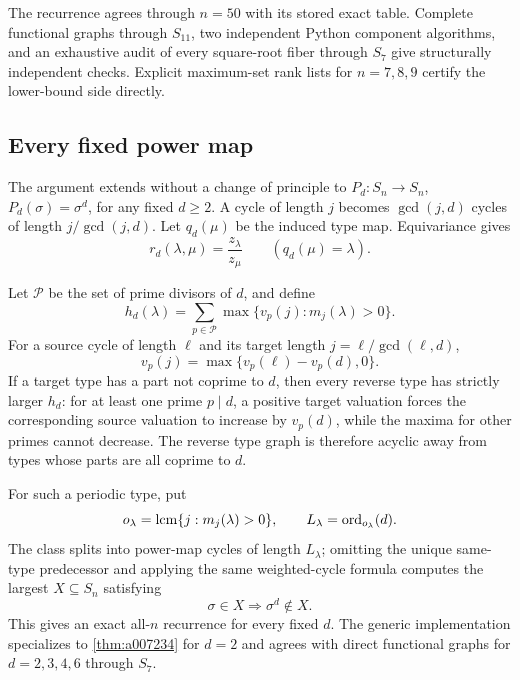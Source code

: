 The recurrence agrees through \(n=50\) with its stored exact table.  Complete
functional graphs through \(S_{11}\), two independent Python component
algorithms, and an exhaustive audit of every square-root fiber through
\(S_7\) give structurally independent checks.  Explicit maximum-set rank lists
for \(n=7,8,9\) certify the lower-bound side directly.

\subsection{Every fixed power map}

The argument extends without a change of principle to
\(P_d:S_n\to S_n\), \(P_d(\sigma)=\sigma^d\), for any fixed \(d\ge2\).  A
cycle of length \(j\) becomes \(\gcd(j,d)\) cycles of length
\(j/\gcd(j,d)\).  Let \(q_d(\mu)\) be the induced type map.  Equivariance gives
\begin{equation}
 r_d(\lambda,\mu)=\frac{z_\lambda}{z_\mu}
 \qquad(q_d(\mu)=\lambda).
 \label{eq:a007234-general-roots}
\end{equation}

Let \(\mathcal P\) be the set of prime divisors of \(d\), and define
\begin{equation}
 h_d(\lambda)=\sum_{p\in\mathcal P}
   \max\{v_p(j):m_j(\lambda)>0\}.
 \label{eq:a007234-height}
\end{equation}
For a source cycle of length \(\ell\) and its target length
\(j=\ell/\gcd(\ell,d)\),
\begin{equation}
 v_p(j)=\max\{v_p(\ell)-v_p(d),0\}.
 \label{eq:a007234-valuation}
\end{equation}
If a target type has a part not coprime to \(d\), then every reverse type has
strictly larger \(h_d\): for at least one prime \(p\mid d\), a positive target
valuation forces the corresponding source valuation to increase by
\(v_p(d)\), while the maxima for other primes cannot decrease.  The reverse
type graph is therefore acyclic away from types whose parts are all coprime to
\(d\).

For such a periodic type, put
\begin{equation}
 o_\lambda=\operatorname{lcm}\{j:m_j(\lambda)>0\},
 \qquad
 L_\lambda=\operatorname{ord}_{o_\lambda}(d).
 \label{eq:a007234-general-period}
\end{equation}
The class splits into power-map cycles of length \(L_\lambda\); omitting the
unique same-type predecessor and applying the same weighted-cycle formula
computes the largest \(X\subseteq S_n\) satisfying
\[
 \sigma\in X\Longrightarrow \sigma^d\notin X.
\]
This gives an exact all-\(n\) recurrence for every fixed \(d\).  The generic
implementation specializes to \cref{thm:a007234} for \(d=2\) and agrees with
direct functional graphs for \(d=2,3,4,6\) through \(S_7\).
